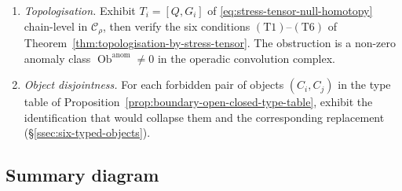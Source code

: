 \begin{enumerate}[label=\textup{(V\arabic*)}]
        \(\operatorname{Cone}(\mathrm{OCA}_N)\).
  \item \emph{Topologisation.}  Exhibit \(T_i=[Q,G_i]\) of
        \eqref{eq:stress-tensor-null-homotopy} chain-level in
        \(\mathcal C_\rho\), then verify the six conditions
        \((\mathrm{T1})\)--\((\mathrm{T6})\) of
        Theorem~\ref{thm:topologisation-by-stress-tensor}.  The
        obstruction is a non-zero anomaly class
        \(\operatorname{Ob}^{\mathrm{anom}}\neq 0\) in the
        operadic convolution complex.
  \item \emph{Object disjointness.}  For each forbidden pair of
        objects \((C_i,C_j)\) in the type table of
        Proposition~\ref{prop:boundary-open-closed-type-table}, exhibit the
        identification that would collapse them and the corresponding
        replacement (\S\ref{ssec:six-typed-objects}).
\end{enumerate}

\subsection{Summary diagram}
\label{ssec:typed-summary-diagram}

